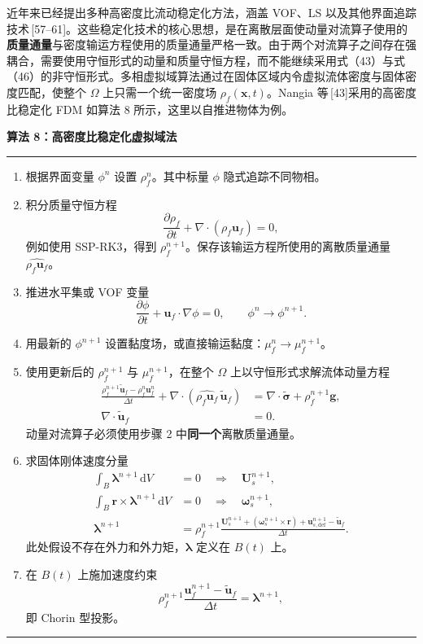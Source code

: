 \documentclass[UTF8,11pt,a4paper]{ctexart}
\newcommand{\dd}{\,\mathrm{d}}
\newenvironment{algbox}[1]{%
  \par\medskip\noindent\textbf{#1}\par\smallskip\hrule\smallskip
  \begin{enumerate}[leftmargin=2.2em,label=\arabic*.]\small
}{%
  \end{enumerate}\smallskip\hrule\par\medskip
}
\begin{document}
近年来已经提出多种高密度比流动稳定化方法，涵盖 VOF、LS 以及其他界面追踪技术\,[57--61]。这些稳定化技术的核心思想，是在离散层面使动量对流算子使用的\textbf{质量通量}与密度输运方程使用的质量通量严格一致。由于两个对流算子之间存在强耦合，需要使用守恒形式的动量和质量守恒方程，而不能继续采用式（43）与式（46）的非守恒形式。多相虚拟域算法通过在固体区域内令虚拟流体密度与固体密度匹配，使整个 $\Omega$ 上只需一个统一密度场 $\rho_f(\bm x,t)$。Nangia 等\,[43]采用的高密度比稳定化 FDM 如算法 8 所示，这里以自推进物体为例。

\begin{algbox}{算法 8：高密度比稳定化虚拟域法}
\item 根据界面变量 $\phi^n$ 设置 $\rho_f^n$。其中标量 $\phi$ 隐式追踪不同物相。
\item 积分质量守恒方程
\[
\frac{\partial\rho_f}{\partial t}+\nabla\cdot(\rho_f\bm u_f)=0,
\]
例如使用 SSP-RK3，得到 $\rho_f^{n+1}$。保存该输运方程所使用的离散质量通量 $\widehat{\rho_f\bm u_f}$。
\item 推进水平集或 VOF 变量
\[
\frac{\partial\phi}{\partial t}+\bm u_f\cdot\nabla\phi=0,
\qquad \phi^n\longrightarrow\phi^{n+1}.
\]
\item 用最新的 $\phi^{n+1}$ 设置黏度场，或直接输运黏度：$\mu_f^n\to\mu_f^{n+1}$。
\item 使用更新后的 $\rho_f^{n+1}$ 与 $\mu_f^{n+1}$，在整个 $\Omega$ 上以守恒形式求解流体动量方程
\begin{align*}
\frac{\rho_f^{n+1}\tilde{\bm u}_f-\rho_f^n\bm u_f^n}{\Delta t}
+\nabla\cdot\left(\widehat{\rho_f\bm u_f}\,\tilde{\bm u}_f\right)
&=\nabla\cdot\tilde{\bm\sigma}+\rho_f^{n+1}\bm g,\\
\nabla\cdot\tilde{\bm u}_f&=0.
\end{align*}
动量对流算子必须使用步骤 2 中\textbf{同一个}离散质量通量。
\item 求固体刚体速度分量
\begin{align*}
\int_B\bm\lambda^{n+1}\dd V&=0\quad\Longrightarrow\quad\bm U_s^{n+1},\\
\int_B\bm r\times\bm\lambda^{n+1}\dd V&=0\quad\Longrightarrow\quad\bm\omega_s^{n+1},\\
\bm\lambda^{n+1}
&=\rho_f^{n+1}\frac{\bm U_s^{n+1}+(\bm\omega_s^{n+1}\times\bm r)+\bm u_{s,\mathrm{def}}^{n+1}-\tilde{\bm u}_f}{\Delta t}.
\end{align*}
此处假设不存在外力和外力矩，$\bm\lambda$ 定义在 $B(t)$ 上。
\item 在 $B(t)$ 上施加速度约束
\[
\rho_f^{n+1}\frac{\bm u_f^{n+1}-\tilde{\bm u}_f}{\Delta t}=\bm\lambda^{n+1},
\]
即 Chorin 型投影。
\end{algbox}
\end{document}
